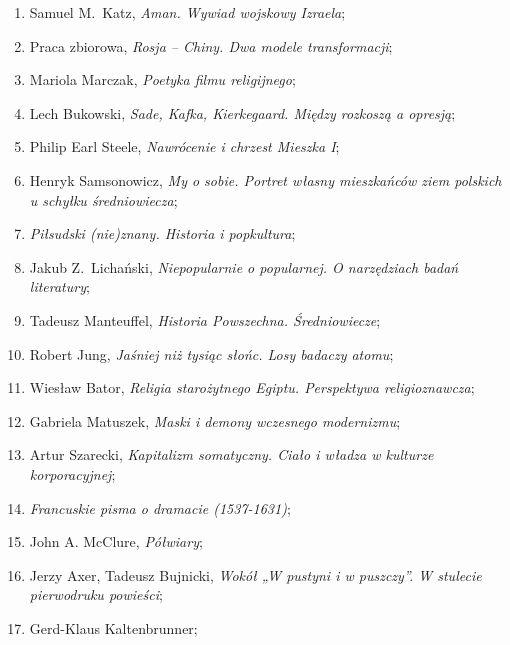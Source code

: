\documentclass[a4paper,11pt]{article}
\begin{document}
\begin{enumerate}
\item Samuel M.~Katz, \textit{Aman. Wywiad wojskowy Izraela};

\item Praca zbiorowa, \textit{Rosja -- Chiny. Dwa modele transformacji};

\item Mariola Marczak, \textit{Poetyka filmu religijnego};

\item Lech Bukowski, \textit{Sade, Kafka, Kierkegaard. Między rozkoszą a
    opresją};

\item Philip Earl Steele, \textit{Nawrócenie i chrzest Mieszka I};

\item Henryk Samsonowicz, \textit{My o sobie. Portret własny mieszkańców
    ziem polskich u schyłku średniowiecza};

\item \textit{Piłsudski (nie)znany. Historia i popkultura};

\item Jakub Z.~Lichański, \textit{Niepopularnie o popularnej. O
    narzędziach badań literatury};

\item Tadeusz Manteuffel, \textit{Historia Powszechna. Średniowiecze};

\item Robert Jung, \textit{Jaśniej niż tysiąc słońc. Losy badaczy
    atomu};

\item Wiesław Bator, \textit{Religia starożytnego Egiptu. Perspektywa
    religioznawcza};

\item Gabriela Matuszek, \textit{Maski i demony wczesnego modernizmu};

\item Artur Szarecki, \textit{Kapitalizm somatyczny. Ciało i władza w
    kulturze korporacyjnej};

\item \textit{Francuskie pisma o dramacie (1537-1631)};

\item John A. McClure, \textit{Półwiary};

\item Jerzy Axer, Tadeusz Bujnicki, \textit{Wokół „W pustyni i w
    puszczy”. W stulecie pierwodruku powieści};

\item Gerd-Klaus Kaltenbrunner;


\end{enumerate}
\end{document}
